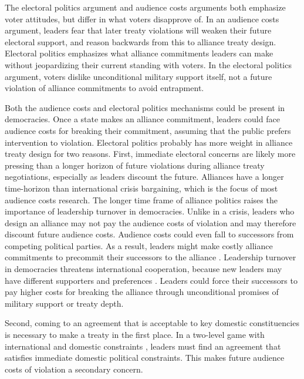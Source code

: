 \documentclass[12pt]{article}
\begin{document}
The electoral politics argument and audience costs arguments both emphasize voter attitudes, but differ in what voters disapprove of.  
In an audience costs argument, leaders fear that later treaty violations will weaken their future electoral support, and reason backwards from this to alliance treaty design. 
Electoral politics emphasizes what alliance commitments leaders can make without jeopardizing their current standing with voters. 
In the electoral politics argument, voters dislike unconditional military support itself, not a future violation of alliance commitments to avoid entrapment. 
    

Both the audience costs and electoral politics mechanisms could be present in democracies. 
Once a state makes an alliance commitment, leaders could face audience costs for breaking their commitment, assuming that the public prefers intervention to violation.  
Electoral politics probably has more weight in alliance treaty design for two reasons.
First, immediate electoral concerns are likely more pressing than a longer horizon of future violations during alliance treaty negotiations, especially as leaders discount the future.  
Alliances have a longer time-horizon than international crisis bargaining, which is the focus of most audience costs research. 
The longer time frame of alliance politics raises the importance of leadership turnover in democracies. 
Unlike in a crisis, leaders who design an alliance may not pay the audience costs of violation and may therefore discount future audience costs. 
Audience costs could even fall to successors from competing political parties. 
As a result, leaders might make costly alliance commitments to precommit their successors to the alliance \citep{Mattes2012a}. 
Leadership turnover in democracies threatens international cooperation, because new leaders may have different supporters and preferences \citep{Lobell2004, Narizny2007, Leedsetal2009}. 
Leaders could force their successors to pay higher costs for breaking the alliance through unconditional promises of military support or treaty depth. 


Second, coming to an agreement that is acceptable to key domestic constituencies is necessary to make a treaty in the first place. 
In a two-level game with international and domestic constraints \citep{Putnam1988}, leaders must find an agreement that satisfies immediate domestic political constraints. 
This makes future audience costs of violation a secondary concern.  
\end{document}
